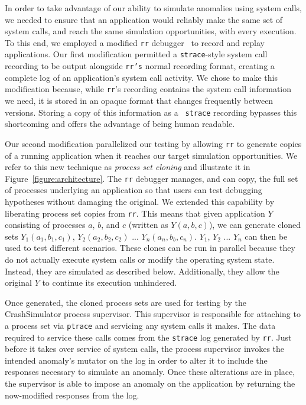 In order to take advantage of our ability to simulate anomalies using
system calls, we needed to ensure that an application would reliably make
the same set of
system calls, and reach the same simulation opportunities,
with every execution.
To this end,
we employed a modified
{\tt rr} debugger~\cite{rrwebsite} to record and replay applications. Our
first modification permitted a {\tt strace}-style system call recording
to be output alongside {\tt rr's} normal recording format,
creating a complete log of an application’s system call activity.
We chose to make this
modification because, while {\tt rr}'s recording contains the system call
information we need, it is stored in an opaque format that changes
frequently between versions.  Storing a copy of this information as a {\tt
strace} recording bypasses this shortcoming and offers the advantage of
being human readable.

Our second modification parallelized our testing
by allowing {\tt rr} to generate copies of a running application when
it reaches our target simulation opportunities.
We refer to this new technique as {\it process set cloning}
and illustrate it
in Figure~\ref{figure:architecture}.
The {\tt rr}
debugger manages, and can copy, the full set of processes underlying an
application so that users can test debugging hypotheses without damaging
the original.  We extended this capability by liberating process
set copies from {\tt rr}.  This means that given application $Y$ consisting
of processes $a$, $b$, and $c$ (written as $Y(a, b, c)$), we can generate
cloned sets $Y_1(a_1, b_1, c_1)$, $Y_2(a_2, b_2, c_2)$ ... $Y_n(a_n, b_b,
c_n)$.  $Y_1$, $Y_2$ ... $Y_n$ can then be used to test different
scenarios.  These clones can be run in parallel because they do not
actually execute system calls or modify the operating system state.
Instead, they are simulated as described below.
Additionally,
they allow the original $Y$ to continue its execution unhindered.

Once generated, the cloned process sets are used
for testing by the CrashSimulator process supervisor.
This supervisor is responsible for attaching to a process set
via {\tt ptrace} and
servicing any system calls it makes.
The data required to service these calls
comes from the  {\tt strace} log
generated by {\tt rr}.
Just before it takes over service of system calls,
the process supervisor invokes the intended anomaly's mutator
on the log in order to alter it to include the responses
necessary to simulate an anomaly.
Once these alterations are in place,
the supervisor is able to impose an anomaly
on the application by returning the now-modified responses from the log.

